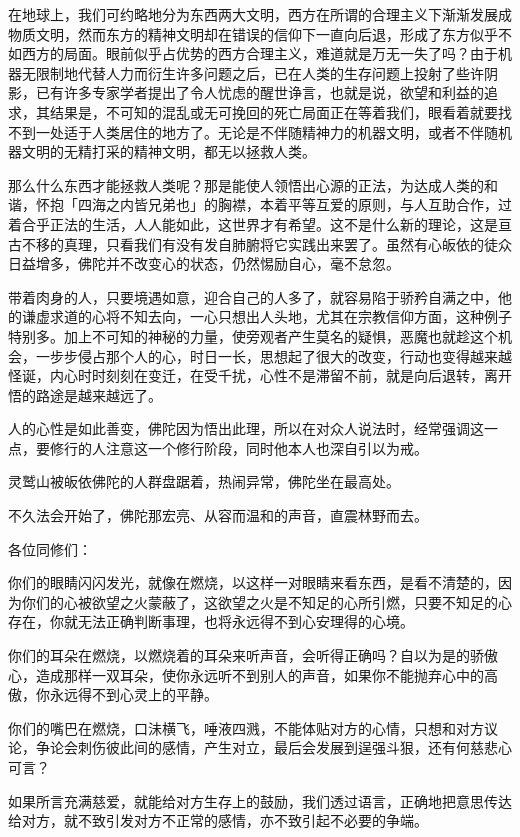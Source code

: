 \documentclass[twoside,openany]{book}
\begin{document}
在地球上，我们可约略地分为东西两大文明，西方在所谓的合理主义下渐渐发展成物质文明，然而东方的精神文明却在错误的信仰下一直向后退，形成了东方似乎不如西方的局面。眼前似乎占优势的西方合理主义，难道就是万无一失了吗？由于机器无限制地代替人力而衍生许多问题之后，已在人类的生存问题上投射了些许阴影，已有许多专家学者提出了令人忧虑的醒世诤言，也就是说，欲望和利益的追求，其结果是，不可知的混乱或无可挽回的死亡局面正在等着我们，眼看着就要找不到一处适于人类居住的地方了。无论是不伴随精神力的机器文明，或者不伴随机器文明的无精打采的精神文明，都无以拯救人类。

那么什么东西才能拯救人类呢？那是能使人领悟出心源的正法，为达成人类的和谐，怀抱「四海之内皆兄弟也」的胸襟，本着平等互爱的原则，与人互助合作，过着合乎正法的生活，人人能如此，这世界才有希望。这不是什么新的理论，这是亘古不移的真理，只看我们有没有发自肺腑将它实践出来罢了。虽然有心皈依的徒众日益增多，佛陀并不改变心的状态，仍然惕励自心，毫不怠忽。

带着肉身的人，只要境遇如意，迎合自己的人多了，就容易陷于骄矜自满之中，他的谦虚求道的心将不知去向，一心只想出人头地，尤其在宗教信仰方面，这种例子特别多。加上不可知的神秘的力量，使旁观者产生莫名的疑惧，恶魔也就趁这个机会，一步步侵占那个人的心，时日一长，思想起了很大的改变，行动也变得越来越怪诞，内心时时刻刻在变迁，在受千扰，心性不是滞留不前，就是向后退转，离开悟的路途是越来越远了。

人的心性是如此善变，佛陀因为悟出此理，所以在对众人说法时，经常强调这一点，要修行的人注意这一个修行阶段，同时他本人也深自引以为戒。

灵鹫山被皈依佛陀的人群盘踞着，热闹异常，佛陀坐在最高处。

不久法会开始了，佛陀那宏亮、从容而温和的声音，直震林野而去。

各位同修们：

你们的眼睛闪闪发光，就像在燃烧，以这样一对眼睛来看东西，是看不清楚的，因为你们的心被欲望之火蒙蔽了，这欲望之火是不知足的心所引燃，只要不知足的心存在，你就无法正确判断事理，也将永远得不到心安理得的心境。

你们的耳朵在燃烧，以燃烧着的耳朵来听声音，会听得正确吗？自以为是的骄傲心，造成那样一双耳朵，使你永远听不到别人的声音，如果你不能抛弃心中的高傲，你永远得不到心灵上的平静。

你们的嘴巴在燃烧，口沬横飞，唾液四溅，不能体贴对方的心情，只想和对方议论，争论会刺伤彼此间的感情，产生对立，最后会发展到逞强斗狠，还有何慈悲心可言？

如果所言充满慈爱，就能给对方生存上的鼓励，我们透过语言，正确地把意思传达给对方，就不致引发对方不正常的感情，亦不致引起不必要的争端。
\end{document}
